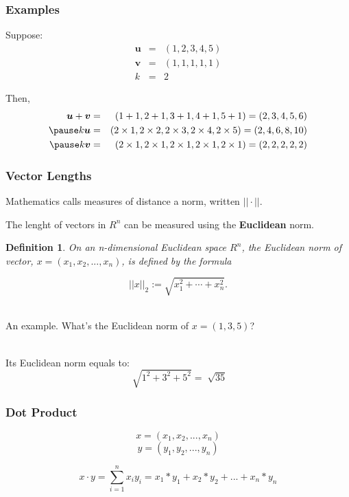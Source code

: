 \documentclass{beamer}
\newtheorem{defn}{Definition}
\numberwithin{equation}{section}
\begin{document}
\begin{frame}
\frametitle{Examples} 

Suppose:
\begin{eqnarray}
\boldsymbol{u} & = & (1, 2, 3, 4, 5) \nonumber \\
\boldsymbol{v} & = & (1, 1, 1, 1, 1) \nonumber \\
k & = & 2 \nonumber 
\end{eqnarray} \pause

Then, 
\begin{eqnarray}
\boldsymbol{u}  + \boldsymbol{v} & = & (1 + 1, 2 + 1, 3+ 1, 4 + 1, 5+ 1)  = (2, 3, 4, 5, 6)\nonumber \\ \pause
k \boldsymbol{u} & = & (2 \times 1, 2 \times 2, 2 \times 3, 2 \times 4, 2 \times 5) = (2, 4, 6, 8, 10) \nonumber \\ \pause
k \boldsymbol{v} & = & (2 \times 1,2 \times 1,2 \times 1,2 \times 1,2 \times 1) = (2, 2, 2, 2, 2) \nonumber 
\end{eqnarray}

\end{frame}



\begin{frame}
\frametitle{Vector Lengths}

Mathematics calls measures of distance a norm, written $||\cdot||$. \pause

The lenght of vectors in $R^n$ can be measured using the \textbf{Euclidean} norm.\pause

\begin{defn}
On an n-dimensional Euclidean space $R^{n}$, the Euclidean norm of vector, $x = (x_{1}, x_{2}, ..., x_{n})$, is defined by the formula

$$ ||x||_{2} :={\sqrt {x_{1}^{2} + \cdots + x_{n}^{2}}}. $$
\end{defn} \pause

\ \\An example. What's the Euclidean norm of $x = (1, 3, 5)$?\pause

\ \\Its Euclidean norm equals to:
$$ \sqrt[]{1^{2} + 3^{2} + 5^{2}} = \sqrt[]{35}$$
\end{frame}




\begin{frame}
\frametitle{Dot Product}
$$x = (x_{1}, x_{2}, ..., x_{n})$$
$$y = (y_{1}, y_{2}, ..., y_{n})$$

$$x\cdot y =\sum_{i=1}^n x_i y_i= x_{1}*y_{1}+ x_{2}* y_{2} +...+x_{n}*y_{n}$$
\end{frame}
\end{document}
